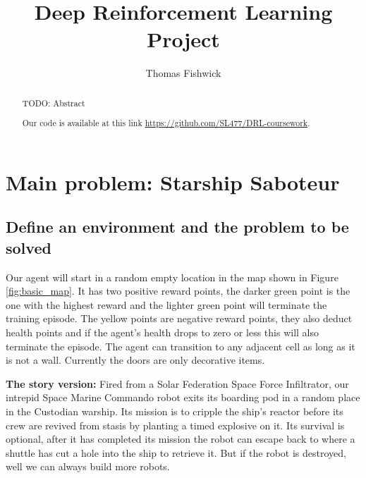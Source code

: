 \documentclass[a4pape, 11pt, english]{article}
\begin{document}
\title{Deep Reinforcement Learning Project}
\author{Thomas Fishwick}
\date{} %
\maketitle

\begin{abstract}
TODO: Abstract

Our code is available at this link \url{https://github.com/SL477/DRL-coursework}.
\end{abstract}

\section{Main problem: Starship Saboteur}
\subsection{Define an environment and the problem to be solved}


Our agent will start in a random empty location in the map shown in Figure \ref{fig:basic_map}. It has two positive reward points, the darker green point is the one with the highest reward and the lighter green point will terminate the training episode. The yellow points are negative reward points, they also deduct health points and if the agent's health drops to zero or less this will also terminate the episode. The agent can transition to any adjacent cell as long as it is not a wall. Currently the doors are only decorative items.

\textbf{The story version:}
Fired from a Solar Federation Space Force Infiltrator, our intrepid Space Marine Commando robot exits its boarding pod in a random place in the Custodian warship. Its mission is to cripple the ship's reactor before its crew are revived from stasis by planting a timed explosive on it. Its survival is optional, after it has completed its mission the robot can escape back to where a shuttle has cut a hole into the ship to retrieve it. But if the robot is destroyed, well we can always build more robots.
\end{document}
